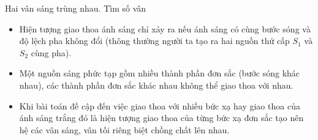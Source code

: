 \begin{dang}{Hai vân sáng trùng nhau. Tìm số vân}
\begin{itemize}
\item Hiện tượng giao thoa ánh sáng chỉ xảy ra nếu ánh sáng có cùng bước sóng và độ lệch pha không đổi (thông thường người ta tạo ra hai nguồn thứ cấp $S_1$ và $S_2$ cùng pha). 
\item Một nguồn sáng phức tạp gồm nhiều thành phần đơn sắc (bước sóng khác nhau), các thành phần đơn sắc khác nhau không thể giao thoa với nhau. 
\item Khi bài toán đề cập đến việc giao thoa với nhiều bức xạ hay giao thoa của ánh sáng trắng đó là hiện tượng giao thoa của từng bức xạ đơn sắc \bth{\Rightarrow} tạo nên hệ các vân sáng, vân tối riêng biệt chồng chất lên nhau.
\end{itemize}

\end{dang}
